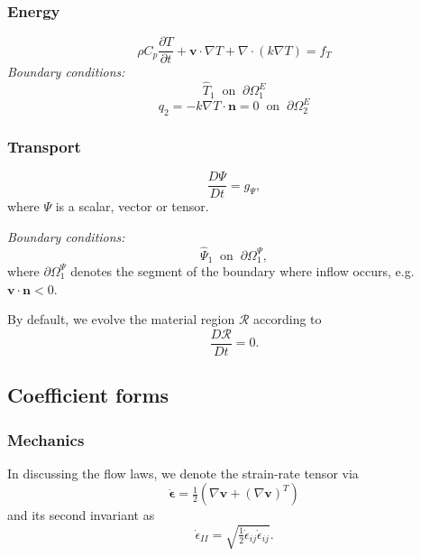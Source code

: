 \documentclass[paper=a4, fontsize=10pt,twoside]{scrartcl}
\begin{document}
\subsubsection*{Energy}
$$
	\rho C_p \frac{\partial T}{\partial t} + \boldsymbol v \cdot \nabla T + \nabla \cdot \left( k \nabla T\right) =  f_T
$$
\textit{Boundary conditions:}
$$
	\hat{T}_1 \medspace \text{ on } \medspace \partial \Omega^E_1
$$
$$
	q_2 = - k \nabla T \cdot \boldsymbol n = 0 \medspace \text{ on } \medspace \partial \Omega^E_2
$$

\subsubsection*{Transport}
$$
	\frac{D \Psi}{D t}  =  g_{\Psi},
$$
where $\Psi$ is a scalar, vector or tensor.

\textit{Boundary conditions:}
$$
	\hat{\Psi}_1 \medspace \text{ on } \medspace \partial \Omega^{\Psi}_1,
$$
where $\partial \Omega^{\Psi}_1$ denotes the segment of the boundary where inflow occurs, e.g. $\boldsymbol v \cdot \boldsymbol n < 0$.

By default, we evolve the material region $\mathcal R$ according to
$$
	\frac{D \mathcal R}{Dt} = 0.
$$

\subsection{Coefficient forms}

\subsubsection*{Mechanics}

In discussing the flow laws, we denote the strain-rate tensor via
$$
	\dot{\boldsymbol \epsilon} = \tfrac{1}{2} \left( \nabla \boldsymbol v + (\nabla \boldsymbol v)^T \right)
$$
and its second invariant as 
$$
	\dot{\epsilon}_{II} = \sqrt{ \tfrac{1}{2} \dot{\epsilon}_{ij} \dot{\epsilon}_{ij} }.
$$
\end{document}
